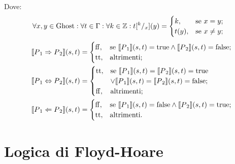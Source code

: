 \documentclass[a4paper, 12pt, oneside,fleqn]{book}
\begin{document}
Dove: \\
\begin{align*}
   \forall x,y\in\mathrm{Ghost}\mathrel{:}\forall t \in\Gamma\mathrel{:}\forall k\in\mathbb{Z} \mathrel{:} t[^k/_x]( y) 
      &=
        \begin{cases}
                 k,   &\text{se $x = y$};\\
                 t(y),&\text{se $x  \neq  y$};
        \end{cases}
\end{align*}
\begin{align*}
    \llbracket P{_1} \Rightarrow P{_2}\rrbracket(s,t) 
       &=
        \begin{cases}
            \mathrm{ff}, &\text{se $\llbracket P{_1}\rrbracket(s,t) = \mathrm{true} \wedge \llbracket P{_2}\rrbracket(s,t) = \mathrm{false}$};\\
            \mathrm{tt}, &\text{altrimenti};
        \end{cases}\\
    \llbracket P{_1} \Leftrightarrow P{_2}\rrbracket(s,t) 
       &=
        \begin{cases}
            \mathrm{tt},&\text{se $\llbracket P{_1}\rrbracket(s,t) = \llbracket P{_2}\rrbracket(s,t) = \mathrm{true}$}\\
                 &\text{$\vee\llbracket P{_1}\rrbracket(s,t) = \llbracket P{_2} \rrbracket(s,t) = \mathrm{false}$};  \\
           \mathrm{ff}, &\text{altrimenti};
        \end{cases} \\
   \llbracket P{_1} \Leftarrow P{_2}\rrbracket(s,t) 
      &=
        \begin{cases}
            \mathrm{ff},&\text{se $\llbracket P{_1}\rrbracket(s,t) = \mathrm{false} \wedge \llbracket P{_2}\rrbracket(s,t) = \mathrm{true}$};\\
            \mathrm{tt},&\text{altrimenti}.
   \end{cases}
\end{align*}
\chapter{Logica di Floyd-Hoare}
\end{document}
